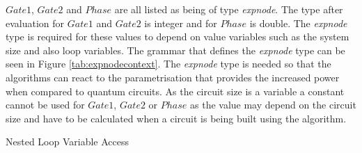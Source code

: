$Gate1$, $Gate2$ and $Phase$ are all listed as being of type \emph{expnode}.
The type after evaluation for $Gate1$ and $Gate2$ is integer and for $Phase$ is double.
The \emph{expnode} type is required for these values to depend on value variables such as the system size and also loop variables.
The grammar that defines the \emph{expnode} type can be seen in Figure \ref{tab:expnodecontext}.
The \emph{expnode} type is needed so that the algorithms can react to the parametrisation that provides the increased power when compared to quantum circuits.
As the circuit size is a variable a constant cannot be used for $Gate1$, $Gate2$ or $Phase$ as the value may depend on the circuit size and have to be calculated when a circuit is being built using the algorithm.

\begin{algorithm}
\begin{algorithmic}
\STATE {}
\STATE {}
\ENDFOR
\ENDFOR
\end{algorithmic}
\caption{Nested Loop Variable Access}
\label{alg:nestloopvars}
\end{algorithm}


